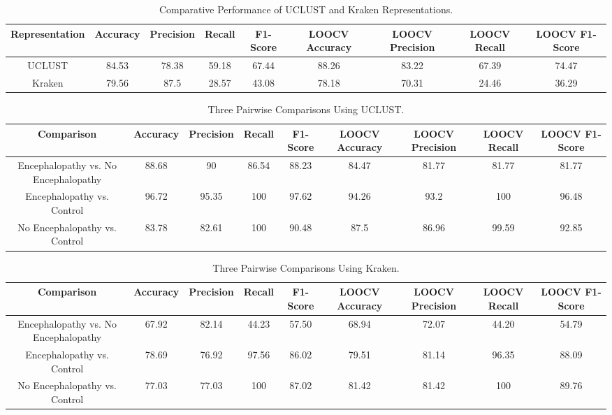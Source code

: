 \begin{table}[t]
\begin{center}
\caption{Comparative Performance of UCLUST and Kraken Representations. 
\label{tab:comp}}
\begin{tabular}{|c|cccc|cccc|}\hline
Representation & Accuracy & Precision & Recall & F1-Score & LOOCV Accuracy & LOOCV Precision & LOOCV Recall & LOOCV F1-Score\\\hline
UCLUST & 84.53 & 78.38 & 59.18 & 67.44 & 88.26 & 83.22 & 67.39 & 74.47\\\hline
Kraken & 79.56 & 87.5 & 28.57 & 43.08 & 78.18 & 70.31 & 24.46 & 36.29\\\hline
\end{tabular}
\end{center}
\end{table}


\begin{table}[t]
\begin{center}
\caption{Three Pairwise Comparisons Using UCLUST. \label{tab:pairuclust}}
\begin{tabular}{|c|cccc|cccc|}\hline
Comparison & Accuracy & Precision & Recall & F1-Score & LOOCV Accuracy & LOOCV Precision & LOOCV Recall & LOOCV F1-Score\\\hline
Encephalopathy vs. No Encephalopathy & 88.68 & 90 & 86.54 & 88.23 & 84.47 & 81.77 & 81.77 & 81.77\\\hline
Encephalopathy vs. Control & 96.72 & 95.35 & 100 & 97.62 & 94.26 & 93.2 & 100 & 96.48\\\hline
No Encephalopathy vs. Control & 83.78 & 82.61 & 100 & 90.48 & 87.5 & 86.96 & 99.59 & 92.85\\\hline
\end{tabular}
\end{center}
\end{table}


\begin{table}[t]
\begin{center}
\caption{Three Pairwise Comparisons Using Kraken. \label{tab:pairkraken}}
\begin{tabular}{|c|cccc|cccc|}\hline
Comparison & Accuracy & Precision & Recall & F1-Score & LOOCV Accuracy & LOOCV Precision & LOOCV Recall & LOOCV F1-Score\\\hline
Encephalopathy vs. No Encephalopathy & 67.92 & 82.14 & 44.23 & 57.50 & 68.94 & 72.07 & 44.20 & 54.79\\\hline
Encephalopathy vs. Control & 78.69 & 76.92 & 97.56 & 86.02 & 79.51 & 81.14 & 96.35 & 88.09\\\hline
No Encephalopathy vs. Control & 77.03 & 77.03 & 100 & 87.02 & 81.42 & 81.42 & 100 & 89.76\\\hline
\end{tabular}
\end{center}
\end{table}


